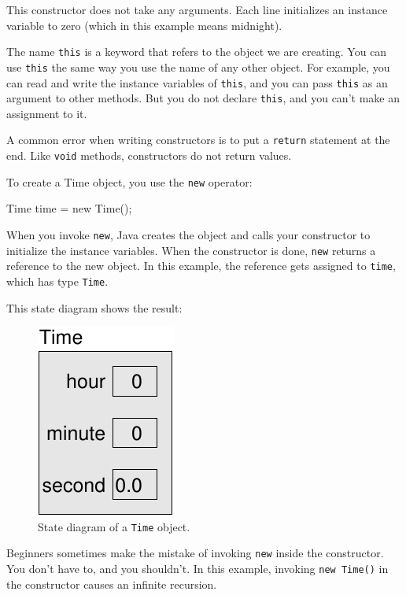 \documentclass[12pt]{book}
\theoremstyle{exercise}
\newcommand{\java}[1]{\verb"#1"}
\begin{document}
This constructor does not take any arguments.
Each line initializes an instance variable to zero (which in this example means midnight).


The name \java{this} is a keyword that refers to the object we are creating.
You can use \java{this} the same way you use the name of any other object.
For example, you can read and write the instance variables of \java{this}, and you can pass \java{this} as an argument to other methods.
But you do not declare \java{this}, and you can't make an assignment to it.

A common error when writing constructors is to put a \java{return} statement at the end.
Like \java{void} methods, constructors do not return values.

To create a Time object, you use the \java{new} operator:

\begin{code}
    Time time = new Time();
\end{code}


When you invoke \java{new}, Java creates the object and calls your constructor to initialize the instance variables.
When the constructor is done, \java{new} returns a reference to the new object.
In this example, the reference gets assigned to \java{time}, which has type \java{Time}.

This state diagram shows the result:

\begin{figure}
\begin{center}
\includegraphics{figs/time.pdf}
\caption{State diagram of a \java{Time} object.}
\label{figs.time}
\end{center}
\end{figure}

Beginners sometimes make the mistake of invoking \java{new} inside the constructor.
You don't have to, and you shouldn't.
In this example, invoking \java{new Time()} in the constructor causes an infinite recursion.
\end{document}
